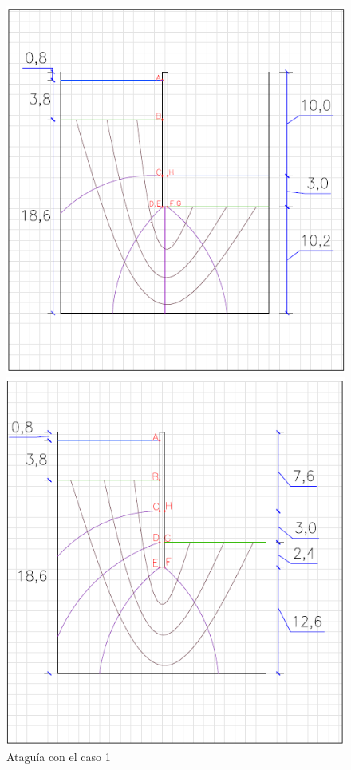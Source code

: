\documentclass{article}
\begin{document}
\begin{figure}[h]
    \centering
    \begin{minipage}{0.32\textwidth}
        \centering
        \includegraphics[width=\textwidth]{graficos/At_caso1.png}
        \caption{Ataguía con el caso 1}
        \label{fig:At_caso1}
    \end{minipage}
    \hfill
    \begin{minipage}{0.32\textwidth}
        \centering
        \includegraphics[width=\textwidth]{graficos/At_caso2.png}

\end{minipage}
\end{figure}
\end{document}
